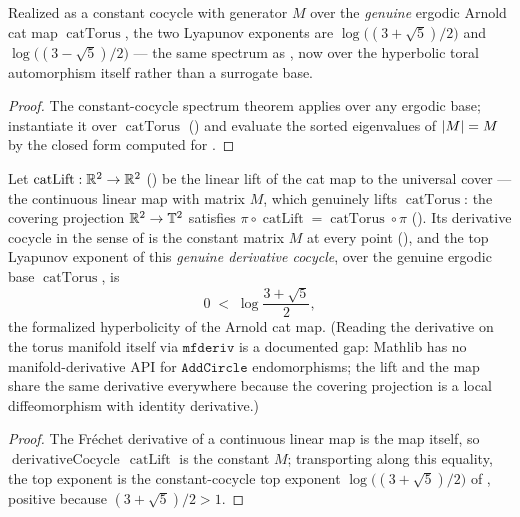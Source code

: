 \begin{theorem}\label{catTorus_constCocycle_exponents}
  \leanok
  Realized as a constant cocycle with generator \(M\) over the \emph{genuine} ergodic Arnold cat
  map \(\operatorname{catTorus}\), the two Lyapunov exponents are
  \(\log\bigl((3+\sqrt5)/2\bigr)\) and \(\log\bigl((3-\sqrt5)/2\bigr)\) --- the same spectrum as
  , now over the hyperbolic toral automorphism itself rather than a
  surrogate base.
\end{theorem}
\begin{proof}\leanok
  The constant-cocycle spectrum theorem applies over any ergodic base; instantiate it over
  \(\operatorname{catTorus}\) () and evaluate the sorted eigenvalues of
  \(\left\lvert M \right\rvert = M\) by the closed form computed for .
\end{proof}

\begin{theorem}\label{catLift_derivativeCocycle_topExponent_pos}
  \leanok
  Let \(\operatorname{catLift}:\mathbb{R}^2\to\mathbb{R}^2\) () be the
  linear lift of the cat map to the universal cover --- the continuous linear map with matrix
  \(M\), which genuinely lifts \(\operatorname{catTorus}\): the covering projection
  \(\mathbb{R}^2\to\mathbb{T}^2\) satisfies
  \(\pi\circ\operatorname{catLift} = \operatorname{catTorus}\circ\pi\)
  (). Its derivative cocycle in the sense
  of  is the constant matrix \(M\) at every point
  (), and the top Lyapunov exponent of
  this \emph{genuine derivative cocycle}, over the genuine ergodic base
  \(\operatorname{catTorus}\), is
  \[
    0 \;<\; \log\frac{3+\sqrt5}{2},
  \]
  the formalized hyperbolicity of the Arnold cat map. (Reading the derivative on the torus
  manifold itself via \(\texttt{mfderiv}\) is a documented gap: Mathlib has no manifold-derivative
  API for \(\texttt{AddCircle}\) endomorphisms; the lift and the map share the same derivative
  everywhere because the covering projection is a local diffeomorphism with identity derivative.)
\end{theorem}
\begin{proof}\leanok
  The Fr\'echet derivative of a continuous linear map is the map itself, so
  \(\operatorname{derivativeCocycle}\,\operatorname{catLift}\) is the constant \(M\); transporting
  along this equality, the top exponent is the constant-cocycle top exponent
  \(\log\bigl((3+\sqrt5)/2\bigr)\) of , positive because
  \((3+\sqrt5)/2 > 1\).
\end{proof}

